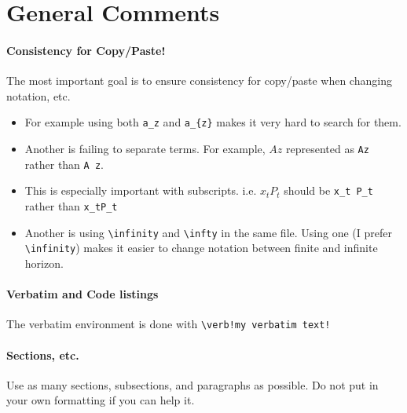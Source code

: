 \documentclass[12pt,etk-draft]{etk-article}
\begin{document}
\section{General Comments}\label{sec:general-comments}
\paragraph{Consistency for Copy/Paste!}  The most important goal is to ensure consistency for copy/paste when changing notation, etc.
\begin{itemize}
\item For example using both \verb!a_z! and \verb!a_{z}! makes it very hard to search for them.
\item Another is failing to separate terms.  For example, $A z$ represented as \verb!Az! rather than \verb!A z!.
\item This is especially important with subscripts.  i.e. $x_t P_t$ should be \verb!x_t P_t! rather than \verb!x_tP_t!
\item Another is using \verb!\infinity! and \verb!\infty! in the same file.  Using one (I prefer \verb!\infinity!) makes it easier to change notation between finite and infinite horizon.
\end{itemize}

\paragraph{Verbatim and Code listings}
The verbatim environment is done with \verb=\verb!my verbatim text!= %
\paragraph{Sections, etc.}
Use as many sections, subsections, and paragraphs as possible.  Do not put in your own formatting if you can help it.
\end{document}
